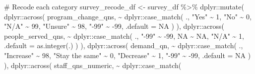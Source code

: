 \documentclass[
  letterpaper,
  DIV=11,
  numbers=noendperiod]{scrreprt}
\newenvironment{Shaded}{\begin{snugshade}}{\end{snugshade}}
\newcommand{\AttributeTok}[1]{\textcolor[rgb]{0.40,0.45,0.13}{#1}}
\newcommand{\CommentTok}[1]{\textcolor[rgb]{0.37,0.37,0.37}{#1}}
\newcommand{\ConstantTok}[1]{\textcolor[rgb]{0.56,0.35,0.01}{#1}}
\newcommand{\DecValTok}[1]{\textcolor[rgb]{0.68,0.00,0.00}{#1}}
\newcommand{\FunctionTok}[1]{\textcolor[rgb]{0.28,0.35,0.67}{#1}}
\newcommand{\NormalTok}[1]{\textcolor[rgb]{0.00,0.23,0.31}{#1}}
\newcommand{\OtherTok}[1]{\textcolor[rgb]{0.00,0.23,0.31}{#1}}
\newcommand{\SpecialCharTok}[1]{\textcolor[rgb]{0.37,0.37,0.37}{#1}}
\newcommand{\StringTok}[1]{\textcolor[rgb]{0.13,0.47,0.30}{#1}}
\begin{document}
\begin{Shaded}
\begin{Highlighting}[]
\CommentTok{\# Recode each category}
\NormalTok{survey\_recode\_df }\OtherTok{\textless{}{-}}\NormalTok{ survey\_df }\SpecialCharTok{\%\textgreater{}\%} 
\NormalTok{  dplyr}\SpecialCharTok{::}\FunctionTok{mutate}\NormalTok{(}
\NormalTok{    dplyr}\SpecialCharTok{::}\FunctionTok{across}\NormalTok{(}
\NormalTok{      program\_change\_qns,}
      \SpecialCharTok{\textasciitilde{}}\NormalTok{ dplyr}\SpecialCharTok{::}\FunctionTok{case\_match}\NormalTok{(}
\NormalTok{        ., }
        \StringTok{"Yes"} \SpecialCharTok{\textasciitilde{}} \DecValTok{1}\NormalTok{, }\StringTok{"No"} \SpecialCharTok{\textasciitilde{}} \DecValTok{0}\NormalTok{, }\StringTok{"N/A"} \SpecialCharTok{\textasciitilde{}} \DecValTok{99}\NormalTok{, }
        \StringTok{"Unsure"} \SpecialCharTok{\textasciitilde{}} \DecValTok{98}\NormalTok{, }\StringTok{"{-}99"} \SpecialCharTok{\textasciitilde{}} \SpecialCharTok{{-}}\DecValTok{99}\NormalTok{,}
        \AttributeTok{.default =} \ConstantTok{NA}
\NormalTok{      )}
\NormalTok{    ),}
\NormalTok{    dplyr}\SpecialCharTok{::}\FunctionTok{across}\NormalTok{(}
\NormalTok{      people\_served\_qns,}
      \SpecialCharTok{\textasciitilde{}}\NormalTok{ dplyr}\SpecialCharTok{::}\FunctionTok{case\_match}\NormalTok{(}
\NormalTok{        .,}
        \StringTok{"{-}99"} \SpecialCharTok{\textasciitilde{}} \SpecialCharTok{{-}}\DecValTok{99}\NormalTok{, }\ConstantTok{NA} \SpecialCharTok{\textasciitilde{}} \ConstantTok{NA}\NormalTok{, }\StringTok{"N/A"} \SpecialCharTok{\textasciitilde{}} \DecValTok{1}\NormalTok{,}
        \AttributeTok{.default =} \FunctionTok{as.integer}\NormalTok{(.)}
\NormalTok{      )}
\NormalTok{    ),}
\NormalTok{    dplyr}\SpecialCharTok{::}\FunctionTok{across}\NormalTok{(}
\NormalTok{      demand\_qn,}
      \SpecialCharTok{\textasciitilde{}}\NormalTok{ dplyr}\SpecialCharTok{::}\FunctionTok{case\_match}\NormalTok{(}
\NormalTok{        .,}
        \StringTok{"Increase"} \SpecialCharTok{\textasciitilde{}} \DecValTok{98}\NormalTok{, }\StringTok{"Stay the same"} \SpecialCharTok{\textasciitilde{}} \DecValTok{0}\NormalTok{, }\StringTok{"Decrease"} \SpecialCharTok{\textasciitilde{}} \DecValTok{1}\NormalTok{,}
        \StringTok{"{-}99"} \SpecialCharTok{\textasciitilde{}} \SpecialCharTok{{-}}\DecValTok{99}\NormalTok{,}
        \AttributeTok{.default =} \ConstantTok{NA}
\NormalTok{      )}
\NormalTok{    ),}
\NormalTok{    dplyr}\SpecialCharTok{::}\FunctionTok{across}\NormalTok{(}
\NormalTok{      staff\_qns\_numeric,}
      \SpecialCharTok{\textasciitilde{}}\NormalTok{ dplyr}\SpecialCharTok{::}\FunctionTok{case\_match}\NormalTok{(}

\end{Highlighting}
\end{Shaded}
\end{document}
